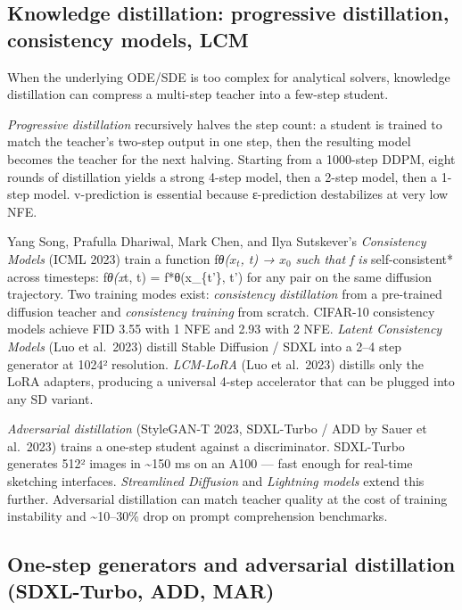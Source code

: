 \documentclass{article}
\begin{document}
\subsection{Knowledge distillation: progressive distillation, consistency models, LCM}\label{knowledge-distillation-progressive-distillation-consistency-models-lcm}

When the underlying ODE/SDE is too complex for analytical solvers, knowledge distillation can compress a multi-step teacher into a few-step student.

\emph{Progressive distillation} \citep{salimans2022progressivedistill} recursively halves the step count: a student is trained to match the teacher's two-step output in one step, then the resulting model becomes the teacher for the next halving. Starting from a 1000-step DDPM, eight rounds of distillation yields a strong 4-step model, then a 2-step model, then a 1-step model. v-prediction is essential because ε-prediction destabilizes at very low NFE.

Yang Song, Prafulla Dhariwal, Mark Chen, and Ilya Sutskever's \emph{Consistency Models} (ICML 2023) train a function f\emph{θ(\(x_t\), t) → \(x_0\) such that f is }self-consistent* across timesteps: f\emph{θ(x}t, t) = f*θ(x\_\{t'\}, t') for any pair on the same diffusion trajectory. Two training modes exist: \emph{consistency distillation} from a pre-trained diffusion teacher and \emph{consistency training} from scratch. CIFAR-10 consistency models achieve FID 3.55 with 1 NFE and 2.93 with 2 NFE. \emph{Latent Consistency Models} (Luo et al.~2023) distill Stable Diffusion / SDXL into a 2--4 step generator at 1024² resolution. \emph{LCM-LoRA} (Luo et al.~2023) distills only the LoRA adapters, producing a universal 4-step accelerator that can be plugged into any SD variant.

\emph{Adversarial distillation} (StyleGAN-T 2023, SDXL-Turbo / ADD by Sauer et al.~2023) trains a one-step student against a discriminator. SDXL-Turbo generates 512² images in \textasciitilde150 ms on an A100 --- fast enough for real-time sketching interfaces. \emph{Streamlined Diffusion} and \emph{Lightning models} extend this further. Adversarial distillation can match teacher quality at the cost of training instability and \textasciitilde10--30\% drop on prompt comprehension benchmarks.

\subsection{One-step generators and adversarial distillation (SDXL-Turbo, ADD, MAR)}\label{one-step-generators-and-adversarial-distillation-sdxl-turbo-add-mar}
\end{document}
